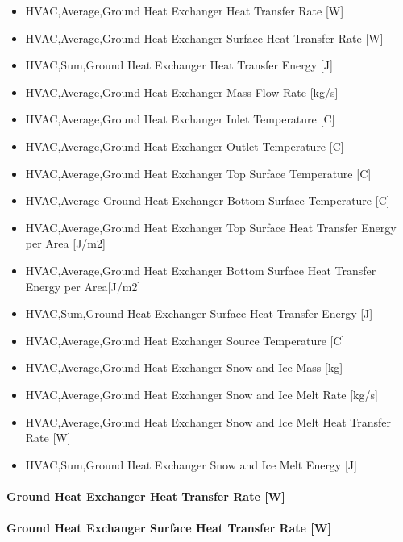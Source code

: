 \begin{itemize}
\item
  HVAC,Average,Ground Heat Exchanger Heat Transfer Rate {[}W{]}
\item
  HVAC,Average,Ground Heat Exchanger Surface Heat Transfer Rate {[}W{]}
\item
  HVAC,Sum,Ground Heat Exchanger Heat Transfer Energy {[}J{]}
\item
  HVAC,Average,Ground Heat Exchanger Mass Flow Rate {[}kg/s{]}
\item
  HVAC,Average,Ground Heat Exchanger Inlet Temperature {[}C{]}
\item
  HVAC,Average,Ground Heat Exchanger Outlet Temperature {[}C{]}
\item
  HVAC,Average,Ground Heat Exchanger Top Surface Temperature {[}C{]}
\item
  HVAC,Average Ground Heat Exchanger Bottom Surface Temperature {[}C{]}
\item
  HVAC,Average,Ground Heat Exchanger Top Surface Heat Transfer Energy per Area {[}J/m2{]}
\item
  HVAC,Average,Ground Heat Exchanger Bottom Surface Heat Transfer Energy per Area{[}J/m2{]}
\item
  HVAC,Sum,Ground Heat Exchanger Surface Heat Transfer Energy {[}J{]}
\item
  HVAC,Average,Ground Heat Exchanger Source Temperature {[}C{]}
\item
  HVAC,Average,Ground Heat Exchanger Snow and Ice Mass {[}kg{]}
\item
  HVAC,Average,Ground Heat Exchanger Snow and Ice Melt Rate {[}kg/s{]}
\item
  HVAC,Average,Ground Heat Exchanger Snow and Ice Melt Heat Transfer Rate {[}W{]}
\item
  HVAC,Sum,Ground Heat Exchanger Snow and Ice Melt Energy {[}J{]}
\end{itemize}

\paragraph{Ground Heat Exchanger Heat Transfer Rate {[}W{]}}\label{ground-heat-exchanger-heat-transfer-rate-w-2}

\paragraph{Ground Heat Exchanger Surface Heat Transfer Rate {[}W{]}}\label{ground-heat-exchanger-surface-heat-transfer-rate-w}

